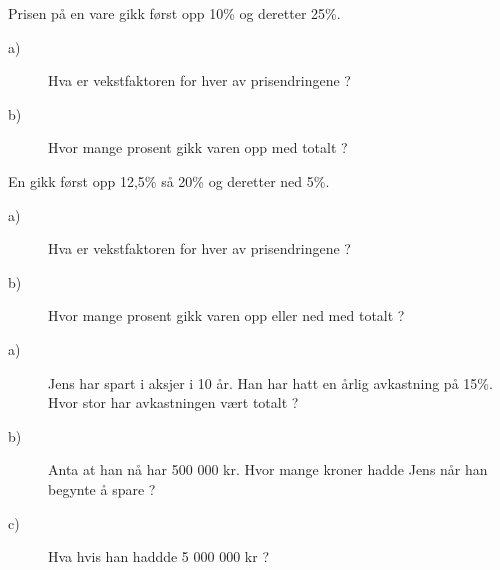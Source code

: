 \documentclass[a4, 11pt, twoside]{article}
\theoremstyle{definition}
\begin{document}
\begin{Exercise}
Prisen på en vare gikk først opp 10\% og deretter 25\%.
  \begin{description}
    \item[a)] Hva er vekstfaktoren for hver av prisendringene ?
    \item[b)] Hvor mange prosent gikk varen opp med totalt ?
  \end{description}
\end{Exercise}


\begin{Exercise}
  En gikk først opp 12,5\% så 20\% og deretter ned 5\%.
  \begin{description}
    \item[a)] Hva er vekstfaktoren for hver av prisendringene ?
    \item[b)] Hvor mange prosent gikk varen opp eller ned med totalt ?
  \end{description}
\end{Exercise}

\begin{Exercise}
\begin{description}
\item[a)] Jens har spart i aksjer i 10 år. Han har hatt en årlig avkastning
på 15\%. Hvor stor har avkastningen vært totalt ?
\item[b)] Anta at han nå har 500 000 kr. Hvor mange kroner hadde Jens når
han begynte å spare ?
\item[c)] Hva hvis han haddde 5 000 000 kr ?
\end{description}
\end{Exercise}
\end{document}
